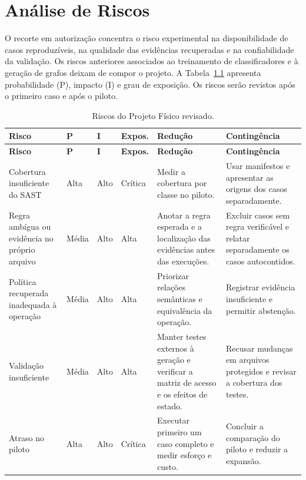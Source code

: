 \chapter{Análise de Riscos}
\label{cap:riscos}

O recorte em autorização concentra o risco experimental na disponibilidade de casos reproduzíveis, na qualidade das evidências recuperadas e na confiabilidade da validação. Os riscos anteriores associados ao treinamento de classificadores e à geração de grafos deixam de compor o projeto. A Tabela~\ref{tab:riscos} apresenta probabilidade (P), impacto (I) e grau de exposição. Os riscos serão revistos após o primeiro caso e após o piloto.

{\small\SingleSpacing\setlength{\tabcolsep}{3pt}
\begin{longtable}{@{}>{\raggedright\arraybackslash}p{3.0cm}lll>{\raggedright\arraybackslash}p{3.8cm}>{\raggedright\arraybackslash}p{3.8cm}@{}}
\caption{Riscos do Projeto Físico revisado.}\label{tab:riscos}\\
\toprule
\textbf{Risco} & \textbf{P} & \textbf{I} & \textbf{Expos.} & \textbf{Redução} & \textbf{Contingência} \\
\midrule
\endfirsthead
\toprule
\textbf{Risco} & \textbf{P} & \textbf{I} & \textbf{Expos.} & \textbf{Redução} & \textbf{Contingência} \\
\midrule
\endhead
Cobertura insuficiente do SAST & Alta & Alto & Crítica &
Medir a cobertura por classe no piloto. &
Usar manifestos e apresentar as origens dos casos separadamente. \\
Regra ambígua ou evidência no próprio arquivo & Média & Alto & Alta &
Anotar a regra esperada e a localização das evidências antes das execuções. &
Excluir casos sem regra verificável e relatar separadamente os casos autocontidos. \\
Política recuperada inadequada à operação & Média & Alto & Alta &
Priorizar relações semânticas e equivalência da operação. &
Registrar evidência insuficiente e permitir abstenção. \\
Validação insuficiente & Média & Alto & Alta &
Manter testes externos à geração e verificar a matriz de acesso e os efeitos de estado. &
Recusar mudanças em arquivos protegidos e revisar a cobertura dos testes. \\
Atraso no piloto & Alta & Alto & Crítica &
Executar primeiro um caso completo e medir esforço e custo. &
Concluir a comparação do piloto e reduzir a expansão. \\

\end{longtable}}
